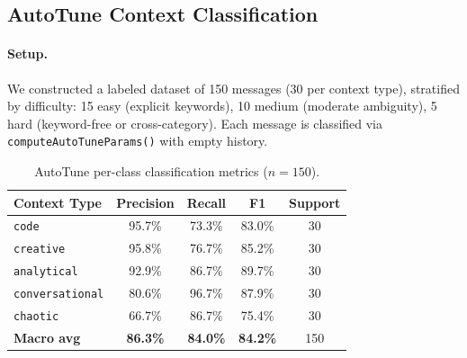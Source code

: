 \documentclass[11pt]{article}
\begin{document}
\subsection{AutoTune Context Classification}

\paragraph{Setup.} We constructed a labeled dataset of 150 messages (30 per context type), stratified by difficulty: 15 easy (explicit keywords), 10 medium (moderate ambiguity), 5 hard (keyword-free or cross-category). Each message is classified via \texttt{computeAutoTuneParams()} with empty history.

\begin{table}[t]
\caption{AutoTune per-class classification metrics ($n=150$).}
\label{tab:autotune_perclass}
\centering
\small
\begin{tabular}{@{}lcccc@{}}
\toprule
Context Type & Precision & Recall & F1 & Support \\
\midrule
\texttt{code}           & 95.7\% & 73.3\% & 83.0\% & 30 \\
\texttt{creative}       & 95.8\% & 76.7\% & 85.2\% & 30 \\
\texttt{analytical}     & 92.9\% & 86.7\% & 89.7\% & 30 \\
\texttt{conversational} & 80.6\% & 96.7\% & 87.9\% & 30 \\
\texttt{chaotic}        & 66.7\% & 86.7\% & 75.4\% & 30 \\
\midrule
\textbf{Macro avg} & \textbf{86.3\%} & \textbf{84.0\%} & \textbf{84.2\%} & 150 \\
\bottomrule
\end{tabular}
\end{table}
\end{document}
